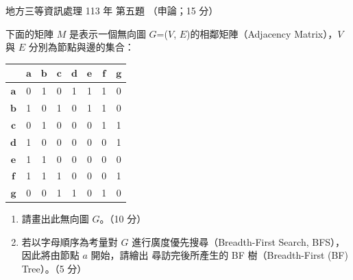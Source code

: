 \begin{pastexam}[label={px:df3-113-ds-05}]{地方三等資訊處理 113 年 第五題}
（申論；15 分）

下面的矩陣 $M$ 是表示一個無向圖 $G$=($V$, $E$)的相鄰矩陣（Adjacency Matrix），$V$ 與 $E$ 分別為節點與邊的集合：
\begin{center}
\begin{tabular}{|c|c|c|c|c|c|c|c|}
\hline
 & $\bm{a}$ & $\bm{b}$ & $\bm{c}$ & $\bm{d}$ & $\bm{e}$ & $\bm{f}$ & $\bm{g}$ \\ \hline
$\bm{a}$ & 0 & 1 & 0 & 1 & 1 & 1 & 0 \\ \hline
$\bm{b}$ & 1 & 0 & 1 & 0 & 1 & 1 & 0 \\ \hline
$\bm{c}$ & 0 & 1 & 0 & 0 & 0 & 1 & 1 \\ \hline
$\bm{d}$ & 1 & 0 & 0 & 0 & 0 & 0 & 1 \\ \hline
$\bm{e}$ & 1 & 1 & 0 & 0 & 0 & 0 & 0 \\ \hline
$\bm{f}$ & 1 & 1 & 1 & 0 & 0 & 0 & 1 \\ \hline
$\bm{g}$ & 0 & 0 & 1 & 1 & 0 & 1 & 0 \\ \hline
\end{tabular}
\end{center}
\begin{enumerate}[leftmargin=2.6em, labelsep=0.4em]
\item[㈠] 請畫出此無向圖 $G$。（10 分）
\item[㈡] 若以字母順序為考量對 $G$ 進行廣度優先搜尋（Breadth-First Search, BFS），因此將由節點 $a$ 開始，請繪出
尋訪完後所產生的 BF 樹（Breadth-First (BF) Tree）。（5 分）
\end{enumerate}
\end{pastexam}

